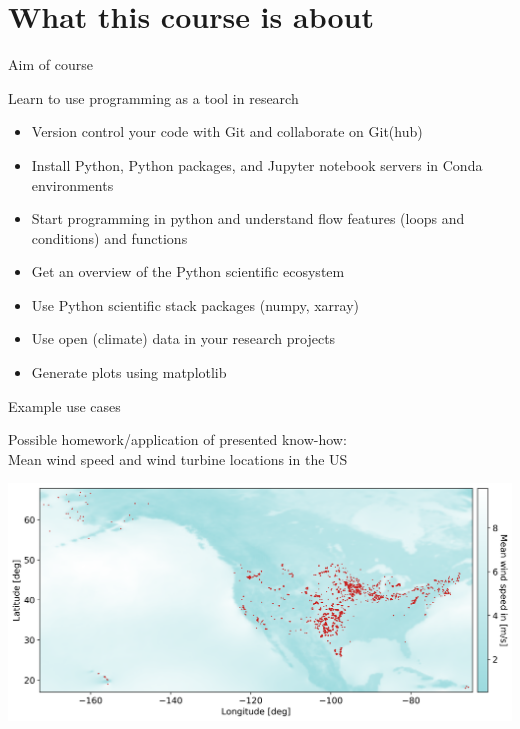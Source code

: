 \documentclass[10pt,color=usenames,dvipsnames]{beamer}
\begin{document}
\section{What this course is about}

\begin{frame}{Aim of course}

	Learn to use programming as a tool in research

	\begin{itemize}
		\item Version control your code with Git and collaborate on Git(hub)
		\item Install Python, Python packages, and Jupyter notebook servers in Conda environments
		\item Start programming in python and understand flow features (loops and conditions) and functions
		\item Get an overview of the Python scientific ecosystem
		\item Use Python scientific stack packages (numpy, xarray)
		\item Use open (climate) data in your research projects
		\item Generate plots using matplotlib
	\end{itemize}

\end{frame}

\begin{frame}{Example use cases}

	Possible homework/application of presented know-how:\\

    Mean wind speed and wind turbine locations in the US

    \includegraphics[width=\textwidth]{mean_wind_speed_and_turbines.png}\\

\end{frame}
\end{document}
